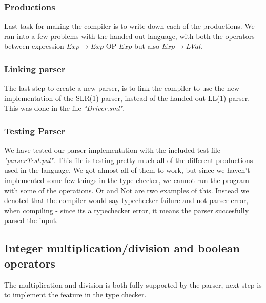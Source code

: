 \documentclass[10pt]{article}
\begin{document}

\subsubsection{Productions}
Last task for making the compiler is to write down each of the productions. We ran into a few problems with the handed out language, with both the operators between expression $Exp \rightarrow Exp \text{ OP } Exp$ but also $Exp \rightarrow LVal$.

\subsubsection{Linking parser}
The last step to create a new parser, is to link the compiler to use the new implementation of the SLR(1) parser, instead of the handed out LL(1) parser. This was done in the file \textit{"Driver.sml"}.

\subsubsection{Testing Parser}
We have tested our parser implementation with the included test file \textit{"parserTest.pal"}. This file is testing pretty much all of the different productions used in the language. We got almost all of them to work, but since we haven't implemented some few things in the type checker, we cannot run the program with some of the operations. Or and Not are two examples of this. Instead we denoted that the compiler would say typechecker failure and not parser error, when compiling - since its a typechecker error, it means the parser succesfully parsed the input.

\subsection{Integer multiplication/division and boolean operators}
The multiplication and division is both fully supported by the parser, next step is to implement the feature in the type checker.\\
\end{document}
